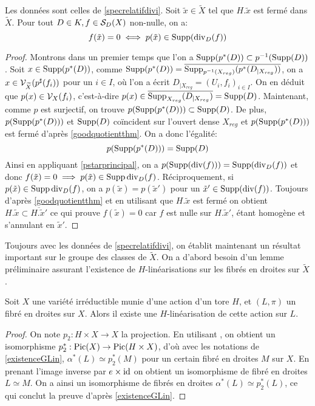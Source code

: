 \begin{cor}\label{zerosspecrelatif}
Les données sont celles de \ref{specrelatifdivi}. Soit $\tilde{x}\in\widetilde{X}$ tel que $H.\tilde{x}$ est fermé dans $\widetilde{X}$. Pour tout $D\in K, f\in \mathcal{S}_D(X)$ non-nulle, on a:
$$f(\tilde{x})=0 \iff p(\tilde{x})\in \operatorname{Supp}(\operatorname{div}_D(f))$$
\end{cor}
\begin{proof}
Montrons dans un premier temps que l'on a $\operatorname{Supp}(p^*(D))\subset p^{-1}(\operatorname{Supp}(D))$. Soit $x\in \operatorname{Supp} (p^*(D))$, comme $\operatorname{Supp}(p^*(D))=\overline{\operatorname{Supp}_{p^{-1}(X_{reg})}(p^*(D_{|X_{reg}}))}$, on a $x\in\mathcal{V}_{\widetilde{X}}(p^\sharp(f_i))$ pour un $i\in I$, où l'on a écrit $D_{|X_{reg}}=(U_i, f_i)_{i\in I}$. On en déduit que $p(x)\in \mathcal{V}_X(f_i)$, c'est-à-dire $p(x)\in \overline{\operatorname{Supp}_{X_{reg}}(D_{|X_{reg}})}=\operatorname{Supp}(D)$. Maintenant, comme $p$ est surjectif, on trouve $p(\operatorname{Supp}(p^*(D)))\subset \operatorname{Supp}(D)$. De plus, $p(\operatorname{Supp}(p^*(D)))$ et $\operatorname{Supp}(D)$ coïncident sur l'ouvert dense $X_{reg}$ et $p(\operatorname{Supp}(p^*(D)))$ est fermé d'après \ref{goodquotientthm}. On a donc l'égalité:$$p(\operatorname{Supp}(p^*(D)))=\operatorname{Supp}(D)$$
Ainsi en appliquant \ref{pstarprincipal}, on a $p(\operatorname{Supp}(\operatorname{div}(f)))= \operatorname{Supp}(\operatorname{div}_D(f))$ et donc $f(\tilde{x})=0 \implies p(\tilde{x})\in\operatorname{Supp} \operatorname{div}_D(f)$. Réciproquement, si $p(\tilde{x})\in\operatorname{Supp} \operatorname{div}_D(f)$, on a $p(\tilde{x})=p(\tilde{x}')$ pour un $\tilde{x}'\in \operatorname{Supp}(\operatorname{div}(f))$. Toujours d'après \ref{goodquotientthm} et en utilisant que $H.\tilde{x}$ est fermé on obtient $H.\tilde{x}\subset\overline{H.\tilde{x}'}$ ce qui prouve $f(\tilde{x})=0$ car $f$ est nulle sur $H.\tilde{x}'$, étant homogène et s'annulant en $\tilde{x}'$.
\end{proof}

Toujours avec les données de \ref{specrelatifdivi}, on établit maintenant un résultat important sur le groupe des classes de $\widetilde{X}$. On a d'abord besoin d'un lemme préliminaire assurant l'existence de $H$-linéarisations sur les fibrés en droites sur $\widetilde{X}$.

\begin{lem}\label{existenceGLinTore}
Soit $X$ une variété irréductible munie d'une action d'un tore $H$, et $(L,\pi)$ un fibré en droites sur $X$. Alors il existe une $H$-linéarisation de cette action sur $L$.
\end{lem}
\begin{proof}
On note $p_2:H\times X\rightarrow X$ la projection. En utilisant \cite[II.6.6]{Hartshorne}, on obtient un isomorphisme $p_2^*:\operatorname{Pic}(X)\rightarrow \operatorname{Pic}(H\times X)$, d'où avec les notations de \ref{existenceGLin}, $\alpha^*(L)\simeq p_2^*(M)$ pour un certain fibré en droites $M$ sur $X$. En prenant l'image inverse par $e\times \operatorname{id}$ on obtient un isomorphisme de fibré en droites $L\simeq M$. On a ainsi un isomorphisme de fibrés en droites $\alpha^*(L)\simeq p_2^*(L)$, ce qui conclut la preuve d'après \ref{existenceGLin}.
\end{proof}

